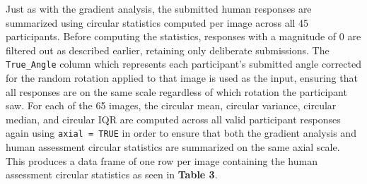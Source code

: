 \documentclass[
]{article}
\newenvironment{Shaded}{\begin{snugshade}}{\end{snugshade}}
\newcommand{\AttributeTok}[1]{\textcolor[rgb]{0.40,0.45,0.13}{#1}}
\newcommand{\CommentTok}[1]{\textcolor[rgb]{0.37,0.37,0.37}{#1}}
\newcommand{\DecValTok}[1]{\textcolor[rgb]{0.68,0.00,0.00}{#1}}
\newcommand{\FunctionTok}[1]{\textcolor[rgb]{0.28,0.35,0.67}{#1}}
\newcommand{\NormalTok}[1]{\textcolor[rgb]{0.00,0.23,0.31}{#1}}
\newcommand{\OtherTok}[1]{\textcolor[rgb]{0.00,0.23,0.31}{#1}}
\newcommand{\SpecialCharTok}[1]{\textcolor[rgb]{0.37,0.37,0.37}{#1}}
\newcommand{\StringTok}[1]{\textcolor[rgb]{0.13,0.47,0.30}{#1}}
\begin{document}
\begin{Shaded}
\end{Shaded}

Just as with the gradient analysis, the submitted human responses are
summarized using circular statistics computed per image across all 45
participants. Before computing the statistics, responses with a
magnitude of 0 are filtered out as described earlier, retaining only
deliberate submissions. The \texttt{True\_Angle} column which represents
each participant's submitted angle corrected for the random rotation
applied to that image is used as the input, ensuring that all responses
are on the same scale regardless of which rotation the participant saw.
For each of the 65 images, the circular mean, circular variance,
circular median, and circular IQR are computed across all valid
participant responses again using \texttt{axial\ =\ TRUE} in order to
ensure that both the gradient analysis and human assessment circular
statistics are summarized on the same axial scale. This produces a data
frame of one row per image containing the human assessment circular
statistics as seen in \textbf{Table 3}.
\end{document}
